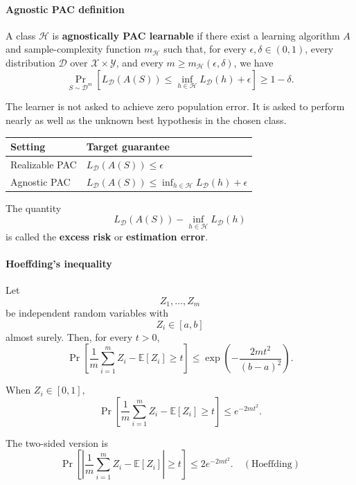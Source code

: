 \documentclass[11pt,a4paper]{article}
\theoremstyle{definition}
\begin{document}
\paragraph{Agnostic PAC definition}
\begin{definition}
A class $\mathcal{H}$ is \textbf{agnostically PAC learnable} if there exist a learning algorithm $A$ and sample-complexity function $m_{\mathcal{H}}$ such that, for every $\epsilon, \delta \in (0, 1)$, every distribution $\mathcal{D}$ over $\mathcal{X} \times \mathcal{Y}$, and every $m \geq m_{\mathcal{H}}(\epsilon, \delta)$,
we have
\[
\Pr_{S \sim \mathcal{D}^m} \left[ L_{\mathcal{D}}(A(S)) \leq \inf_{h \in \mathcal{H}} L_{\mathcal{D}}(h) + \epsilon \right] \geq 1 - \delta.
\]
\end{definition}

The learner is not asked to achieve zero population error. It is asked to perform nearly as well as the unknown best hypothesis in the chosen class.

\begin{center}
\begin{tabular}{|l|l|}
\hline
\textbf{Setting} & \textbf{Target guarantee} \\ \hline
Realizable PAC & $L_{\mathcal{D}}(A(S)) \leq \epsilon$ \\ \hline
Agnostic PAC & $L_{\mathcal{D}}(A(S)) \leq \inf_{h \in \mathcal{H}} L_{\mathcal{D}}(h) + \epsilon$ \\ \hline
\end{tabular}
\end{center}
The quantity
\[
L_{\mathcal{D}}(A(S)) - \inf_{h \in \mathcal{H}} L_{\mathcal{D}}(h)
\]
is called the \textbf{excess risk} or \textbf{estimation error}.

\paragraph{Hoeffding's inequality}

Let
\[
Z_1, \dots, Z_m
\]
be independent random variables with
\[
Z_i \in [a, b]
\]
almost surely. Then, for every $t > 0$,
\[
\boxed{\Pr \left[ \frac{1}{m} \sum_{i=1}^m Z_i - \mathbb{E}[Z_i] \geq t \right] \leq \exp \left( -\frac{2mt^2}{(b-a)^2} \right).}
\]

When $Z_i \in [0, 1]$,
\[
\Pr \left[ \frac{1}{m} \sum_{i=1}^m Z_i - \mathbb{E}[Z_i] \geq t \right] \leq e^{-2mt^2}.
\]

The two-sided version is
\[
\boxed{\Pr \left[ \left| \frac{1}{m} \sum_{i=1}^m Z_i - \mathbb{E}[Z_i] \right| \geq t \right] \leq 2e^{-2mt^2}.} \quad (\text{Hoeffding})
\]
\end{document}
